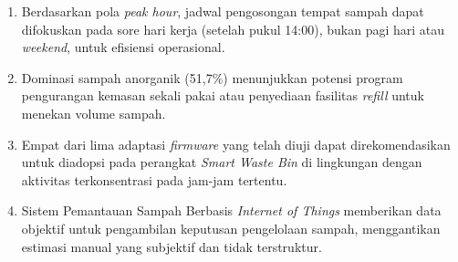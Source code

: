 \begin{enumerate}
  \item Berdasarkan pola \textit{peak hour}, jadwal pengosongan tempat sampah dapat difokuskan pada sore hari kerja (setelah pukul 14:00), bukan pagi hari atau \textit{weekend}, untuk efisiensi operasional.

  \item Dominasi sampah anorganik (51,7\%) menunjukkan potensi program pengurangan kemasan sekali pakai atau penyediaan fasilitas \textit{refill} untuk menekan volume sampah.

  \item Empat dari lima adaptasi \textit{firmware} yang telah diuji dapat direkomendasikan untuk diadopsi pada perangkat \textit{Smart Waste Bin} di lingkungan dengan aktivitas terkonsentrasi pada jam-jam tertentu.

  \item Sistem Pemantauan Sampah Berbasis \textit{Internet of Things} memberikan data objektif untuk pengambilan keputusan pengelolaan sampah, menggantikan estimasi manual yang subjektif dan tidak terstruktur.
\end{enumerate}